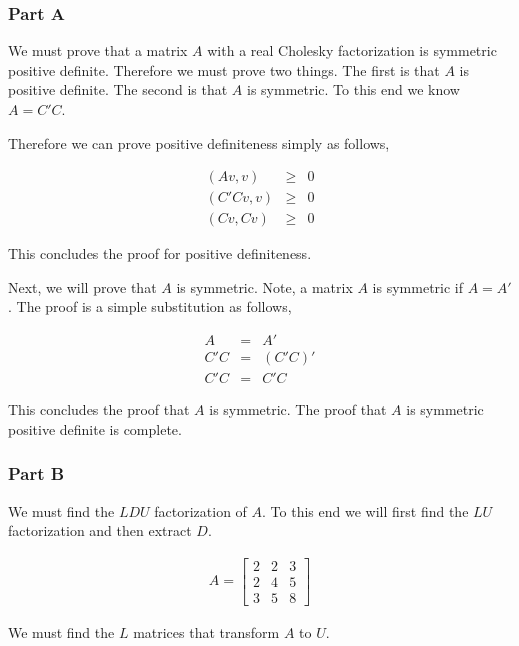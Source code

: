 \subsubsection{Part A}

We must prove that a matrix \(A\) with a real Cholesky factorization is symmetric positive definite.
Therefore we must prove two things.
The first is that \(A\) is positive definite.
The second is that \(A\) is symmetric.
To this end we know \(A = C'C\).

Therefore we can prove positive definiteness simply as follows,

\begin{eqnarray}
  (Av,v) &\ge& 0 \\
  (C'Cv,v) &\ge& 0 \\
  (Cv,Cv) &\ge& 0
\end{eqnarray}

This concludes the proof for positive definiteness.

Next, we will prove that \(A\) is symmetric.
Note, a matrix \(A\) is symmetric if \(A = A'\).
The proof is a simple substitution as follows,

\begin{eqnarray}
  A &=& A' \\
  C'C &=& (C'C)' \\
  C'C &=& C'C
\end{eqnarray}

This concludes the proof that \(A\) is symmetric.
The proof that \(A\) is symmetric positive definite is complete.

\subsubsection{Part B}

We must find the \(LDU\) factorization of \(A\).
To this end we will first find the \(LU\) factorization and then extract \(D\).

\begin{eqnarray}
  A =
  \begin{bmatrix}
    2 & 2 & 3 \\
    2 & 4 & 5 \\
    3 & 5 & 8
  \end{bmatrix}
\end{eqnarray}

We must find the \(L\) matrices that transform \(A\) to \(U\).

